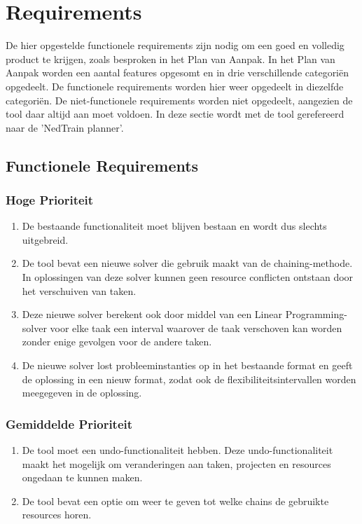 \section{Requirements}
De hier opgestelde functionele requirements zijn nodig om een goed en volledig product te krijgen, zoals besproken in het Plan van Aanpak. In het Plan van Aanpak worden een aantal features opgesomt en in drie verschillende categori\"en opgedeelt. De functionele requirements worden hier weer opgedeelt in diezelfde categori\"en. De niet-functionele requirements worden niet opgedeelt, aangezien de tool daar altijd aan moet voldoen. In deze sectie wordt met de tool gerefereerd naar de 'NedTrain planner'.

\subsection{Functionele Requirements}
\subsubsection*{Hoge Prioriteit}
\begin{enumerate}
    \item De bestaande functionaliteit moet blijven bestaan en wordt dus slechts uitgebreid.
    \item De tool bevat een nieuwe solver die gebruik maakt van de chaining-methode. In oplossingen van deze solver kunnen geen resource conflicten ontstaan door het verschuiven van taken.
    \item Deze nieuwe solver berekent ook door middel van een Linear Programming-solver voor elke taak een interval waarover de taak verschoven kan worden zonder enige gevolgen voor de andere taken.
    \item De nieuwe solver lost probleeminstanties op in het bestaande format en geeft de oplossing in een nieuw format, zodat ook de flexibiliteitsintervallen worden meegegeven in de oplossing.
\end{enumerate}

\subsubsection*{Gemiddelde Prioriteit}
\begin{enumerate}[resume]
    \item De tool moet een undo-functionaliteit hebben. Deze undo-functionaliteit maakt het mogelijk om veranderingen aan taken, projecten en resources ongedaan te kunnen maken.
    \item De tool bevat een optie om weer te geven tot welke chains de gebruikte resources horen. 
\end{enumerate}

